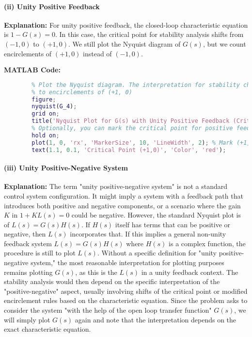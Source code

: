 \documentclass[a4paper,12pt]{article}
\begin{document}
	\paragraph{(ii) Unity Positive Feedback}
	\textbf{Explanation:}
	For unity positive feedback, the closed-loop characteristic equation is $1 - G(s) = 0$. In this case, the critical point for stability analysis shifts from $(-1, 0)$ to $(+1, 0)$. We still plot the Nyquist diagram of $G(s)$, but we count encirclements of $(+1, 0)$ instead of $(-1, 0)$.
	
	\textbf{MATLAB Code:}
	\begin{lstlisting}[language=Matlab, caption=MATLAB Code for Problem 4(ii) (Unity Positive Feedback)]
		% The open-loop transfer function remains G_4
		% Plot the Nyquist diagram. The interpretation for stability changes
		% to encirclements of (+1, 0)
		figure;
		nyquist(G_4);
		grid on;
		title('Nyquist Plot for G(s) with Unity Positive Feedback (Critical Point is +1,0)');
		% Optionally, you can mark the critical point for positive feedback
		hold on;
		plot(1, 0, 'rx', 'MarkerSize', 10, 'LineWidth', 2); % Mark (+1,0)
		text(1.1, 0.1, 'Critical Point (+1,0)', 'Color', 'red');
	\end{lstlisting}
	
	\paragraph{(iii) Unity Positive-Negative System}
	\textbf{Explanation:}
	The term "unity positive-negative system" is not a standard control system configuration. It might imply a system with a feedback path that introduces both positive and negative components, or a scenario where the gain $K$ in $1+KL(s)=0$ could be negative. However, the standard Nyquist plot is of $L(s) = G(s)H(s)$. If $H(s)$ itself has terms that can be positive or negative, then $L(s)$ incorporates that.
	If this implies a general non-unity feedback system $L(s) = G(s)H(s)$ where $H(s)$ is a complex function, the procedure is still to plot $L(s)$.
	Without a specific definition for "unity positive-negative system," the most reasonable interpretation for plotting purposes remains plotting $G(s)$, as this is the $L(s)$ in a unity feedback context. The stability analysis would then depend on the specific interpretation of the "positive-negative" aspect, usually involving shifts of the critical point or modified encirclement rules based on the characteristic equation. Since the problem asks to consider the system "with the help of the open loop transfer function" $G(s)$, we will simply plot $G(s)$ again and note that the interpretation depends on the exact characteristic equation.
	
\end{document}
